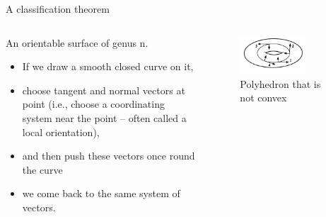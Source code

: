 \documentclass{beamer}
\begin{document}
\begin{frame}{A classification theorem}
  \begin{columns}
    \begin{column}{0.6\textwidth}
      \begin{block}{}
        An orientable surface of genus n.
        \begin{itemize}
        \item If we draw a smooth closed curve on it,
        \item choose tangent and normal vectors at point (i.e., choose a coordinating system near the point -- often called a local orientation),
        \item and then push these vectors once round the curve
        \item we come back to the same system of vectors.
        \end{itemize}
      \end{block}
    \end{column}
    \begin{column}{0.4\textwidth}
      \begin{figure}
        \centering
        \includegraphics[width=0.7\textwidth]{figure_1_19_a.png}
        \caption{Polyhedron that is not convex}
      \end{figure}
    \end{column}
  \end{columns}
\end{frame}
\end{document}
